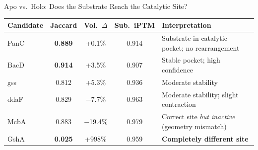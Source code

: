 \documentclass[aspectratio=169, 11pt]{beamer}
\begin{document}
\begin{frame}{Apo vs.\ Holo: Does the Substrate Reach the Catalytic Site?}
\vspace{-8pt}

\begin{center}
\small
\begin{tabular}{lcccl}
\toprule
\textbf{Candidate} & \textbf{Jaccard} & \textbf{Vol.\ $\Delta$} & \textbf{Sub.\ iPTM} & \textbf{Interpretation} \\
\midrule
\rowcolor{accentgreen!15} PanC & \textbf{0.889} & +0.1\% & 0.914 & Substrate in catalytic pocket; no rearrangement \\
\rowcolor{accentgreen!15} BacD & \textbf{0.914} & +3.5\% & 0.907 & Stable pocket; high confidence \\
\rowcolor{lightblue!30} gss & 0.812 & +5.3\% & 0.936 & Moderate stability \\
\rowcolor{lightblue!30} ddaF & 0.829 & $-$7.7\% & 0.963 & Moderate stability; slight contraction \\
\rowcolor{accentred!15} McbA & 0.883 & $-$19.4\% & 0.979 & Correct site \textit{but inactive} (geometry mismatch) \\
\rowcolor{accentorange!15} GshA & \textbf{0.025} & +998\% & 0.959 & \textbf{Completely different site} \\
\bottomrule
\end{tabular}
\end{center}


\end{frame}
\end{document}
